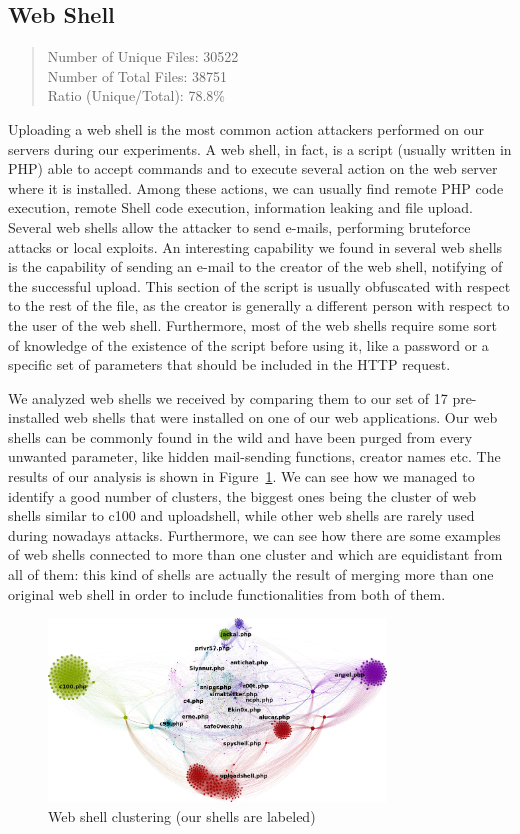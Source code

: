 \subsection{Web Shell}

\begin{quote}
Number of Unique Files: 30522\\
Number of Total Files: 38751\\
Ratio (Unique/Total): 78.8\%
\end{quote}

Uploading a web shell is the most common action attackers performed on our servers during our experiments. A web shell, in fact, is a script (usually written in PHP) able to accept commands and to execute several action on the web server where it is installed. Among these actions, we can usually find remote PHP code execution, remote Shell code execution, information leaking and file upload. Several web shells allow the attacker to send e-mails, performing bruteforce attacks or local exploits. An interesting capability we found in several web shells is the capability of sending an e-mail to the creator of the web shell, notifying of the successful upload. This section of the script is usually obfuscated with respect to the rest of the file, as the creator is generally a different person with respect to the user of the web shell. Furthermore, most of the web shells require some sort of knowledge of the existence of the script before using it, like a password or a specific set of parameters that should be included in the HTTP request.

We analyzed web shells we received by comparing them to our set of 17 pre-installed web shells that were installed on one of our web applications. Our web shells can be commonly found in the wild and have been purged from every unwanted parameter, like hidden mail-sending functions, creator names etc. The results of our analysis is shown in Figure~\ref{fig:shellsClusters}. We can see how we managed to identify a good number of clusters, the biggest ones being the cluster of web shells similar to c100 and uploadshell, while other web shells are rarely used during nowadays attacks.
Furthermore, we can see how there are some examples of web shells connected to more than one cluster and which are equidistant from all of them: this kind of shells are actually the result of merging more than one original web shell in order to include functionalities from both of them.


\begin{figure}[H]
\centerline{\includegraphics[width=0.8\textwidth]{Images/shellsClusters.png}}
\caption{Web shell clustering (our shells are labeled)\label{fig:shellsClusters}}
\end{figure}

